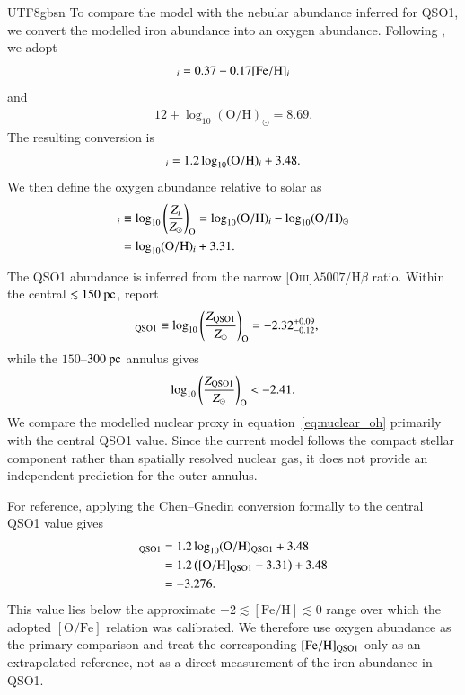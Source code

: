 \documentclass[trackchanges, twocolappendix, twocolumn]{aastex701}
\begin{document}
\begin{CJK*}{UTF8}{gbsn}
To compare the model with the nebular abundance inferred for QSO1, we convert
the modelled iron abundance into an oxygen abundance. Following \citet{Chen&Gnedin2024aGC}, we adopt
\begin{align}
[{\rm O/Fe}]_i = 0.37 - 0.17[{\rm Fe/H}]_i
\end{align}
and \citep{Asplund+2021Metal}
\begin{align}
12+\log_{10}(\mathrm{O/H})_\odot=8.69.
\end{align}
The resulting conversion is
\begin{align}
[{\rm Fe/H}]_i = 1.2 \log_{10} ({\rm O/H})_i + 3.48 .
\end{align}
We then define the oxygen abundance relative to solar as
\begin{align}
[{\rm O/H}]_i & \equiv \log_{10} \left( \dfrac{Z_i}{Z_\odot} \right)_{\rm O} = \log_{10} ({\rm O/H})_i - \log_{10} ({\rm O/H})_\odot \\
& = \log_{10}(\mathrm{O/H})_i + 3.31 .
\label{eq:oh_model}
\end{align}

The QSO1 abundance is inferred from the narrow
[\textsc{Oiii}]$\lambda 5007$/H$\beta$ ratio. Within the central $\lesssim 150~{\rm pc}$, \citet{Maiolino+2026A2744-QSO1} report
\begin{align}
[\mathrm{O/H}]_{\rm QSO1} & \equiv \log_{10} \left( \dfrac{Z_{\rm QSO1}}{Z_\odot} \right)_{\rm O} = - 2.32^{+ 0.09}_{- 0.12} ,
\label{eq:qso1_central_metallicity}
\end{align}
while the $150$--$300~{\rm pc}$ annulus gives
\begin{align}
\log_{10} \left( \dfrac{Z_{\rm QSO1}}{Z_\odot} \right)_{\rm O} < -2.41 .
\label{eq:qso1_outer_metallicity}
\end{align}
We compare the modelled nuclear proxy in equation~\eqref{eq:nuclear_oh}
primarily with the central QSO1 value. Since the current model follows the
compact stellar component rather than spatially resolved nuclear gas, it does
not provide an independent prediction for the outer annulus.

For reference, applying the Chen--Gnedin conversion formally to the central
QSO1 value gives
\begin{align}
[{\rm Fe/H}]_{\rm QSO1} & = 1.2 \log_{10} ({\rm O/H})_{\rm QSO1} + 3.48 \notag \\
& = 1.2 \left( [{\rm O/H}]_{\rm QSO1} - 3.31 \right) + 3.48 \notag \\
& = -3.276 .
\end{align}
This value lies below the approximate
$-2\lesssim[\mathrm{Fe/H}]\lesssim0$ range over which the adopted
$[\mathrm{O/Fe}]$ relation was calibrated. We therefore use oxygen abundance
as the primary comparison and treat the corresponding
$[{\rm Fe/H}]_{\rm QSO1}$ only as an extrapolated reference, not as
a direct measurement of the iron abundance in QSO1.


\end{CJK*}
\end{document}
